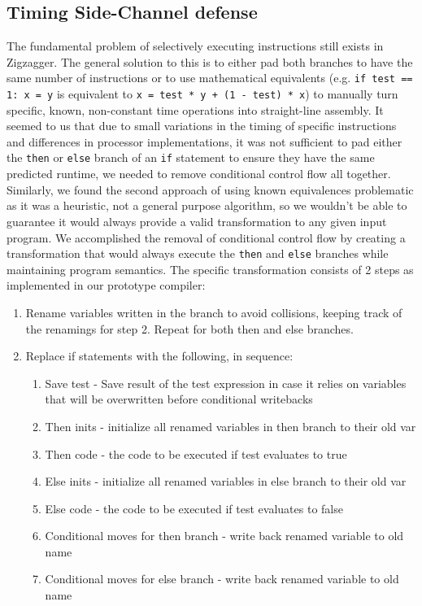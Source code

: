 \documentclass[sigplan, review]{acmart}
\begin{document}
\subsection{Timing Side-Channel defense}
The fundamental problem of selectively executing instructions still exists in Zigzagger. The general solution to this is to either pad both branches to have the same number of instructions or to use mathematical equivalents (e.g. \texttt{if test == 1: x = y} is equivalent to \texttt{x = test * y + (1 - test) * x}) to manually turn specific, known, non-constant time operations into straight-line assembly. It seemed to us that due to small variations in the timing of specific instructions and differences in processor implementations, it was not sufficient to pad either the \texttt{then} or \texttt{else} branch of an \texttt{if} statement to ensure they have the same predicted runtime, we needed to remove conditional control flow all together. Similarly, we found the second approach of using known equivalences problematic as it was a heuristic, not a general purpose algorithm, so we wouldn’t be able to guarantee it would always provide a valid transformation to any given input program. We accomplished the removal of conditional control flow by creating a transformation that would always execute the \texttt{then} and \texttt{else} branches while maintaining program semantics. The specific transformation consists of 2 steps as implemented in our prototype compiler:

\begin{enumerate}
   \item Rename variables written in the branch to avoid collisions, keeping track of the renamings for step 2. Repeat for both then and else branches.
   \item Replace if statements with the following, in sequence:
   \begin{enumerate}
       \item Save test - Save result of the test expression in case it relies on variables that will be overwritten before conditional writebacks
       \item Then inits - initialize all renamed variables in then branch to their old var
       \item Then code - the code to be executed if test evaluates to true
       \item Else inits - initialize all renamed variables in else branch to their old var
       \item Else code - the code to be executed if test evaluates to false
       \item Conditional moves for then branch - write back renamed variable to old name
       \item Conditional moves for else branch - write back renamed variable to old name
   \end{enumerate}
\end{enumerate}
\end{document}
